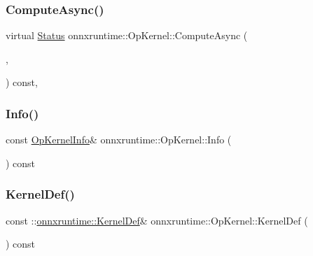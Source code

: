 \subsubsection{\texorpdfstring{Compute\+Async()}{ComputeAsync()}}
{\footnotesize\ttfamily virtual \mbox{\hyperlink{classonnxruntime_1_1common_1_1Status}{Status}} onnxruntime\+::\+Op\+Kernel\+::\+Compute\+Async (\begin{DoxyParamCaption}\item[{\mbox{\hyperlink{classonnxruntime_1_1OpKernelContext}{Op\+Kernel\+Context}} $\ast$}]{,  }\item[{\mbox{\hyperlink{classonnxruntime_1_1OpKernel_adee0f70567925d90c35b3c5b92ee87ac}{Done\+Callback}}}]{ }\end{DoxyParamCaption}) const\hspace{0.3cm}{\ttfamily [inline]}, {\ttfamily [virtual]}}

\mbox{\label{classonnxruntime_1_1OpKernel_a6eaab44623ad2e38113f3411660af9f0}} 
\subsubsection{\texorpdfstring{Info()}{Info()}}
{\footnotesize\ttfamily const \mbox{\hyperlink{classonnxruntime_1_1OpKernelInfo}{Op\+Kernel\+Info}}\& onnxruntime\+::\+Op\+Kernel\+::\+Info (\begin{DoxyParamCaption}{ }\end{DoxyParamCaption}) const\hspace{0.3cm}{\ttfamily [inline]}}

\mbox{\label{classonnxruntime_1_1OpKernel_ab0ee459317ba9184f242c904afb2f381}} 
\subsubsection{\texorpdfstring{Kernel\+Def()}{KernelDef()}}
{\footnotesize\ttfamily const \+::\mbox{\hyperlink{classonnxruntime_1_1KernelDef}{onnxruntime\+::\+Kernel\+Def}}\& onnxruntime\+::\+Op\+Kernel\+::\+Kernel\+Def (\begin{DoxyParamCaption}{ }\end{DoxyParamCaption}) const\hspace{0.3cm}{\ttfamily [inline]}}

